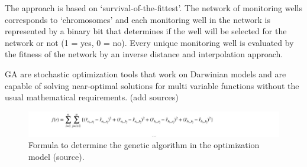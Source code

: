 The approach is based on ‘survival-of-the-fittest’. The network of monitoring wells corresponds to ‘chromosomes’ and each monitoring well in the network is represented by a binary bit that determines if the well will be selected for the network or not (1 = yes, 0 = no). Every unique monitoring well is evaluated by the fitness of the network by an inverse distance and interpolation approach.

GA are stochastic optimization tools that work on Darwinian models and are capable of solving near-optimal solutions for multi variable functions without the usual mathematical requirements. (add sources)

\begin{figure}[htbp]
    \centering
    \includegraphics[width=0.70\linewidth]{appendix/ga.png}
    \caption{Formula to determine the genetic algorithm in the optimization model (source).}
    \label{GA}
\end{figure}








